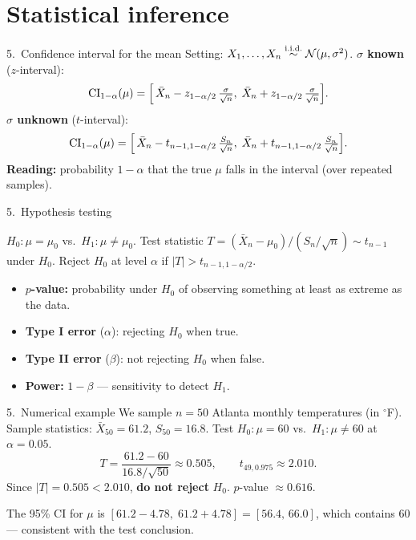 \documentclass[aspectratio=169]{beamer}
\begin{document}
\section{Statistical inference}

\begin{frame}{5.~Confidence interval for the mean}
  Setting: $X_1, \dots, X_n \overset{\text{i.i.d.}}{\sim} \mathcal{N}(\mu, \sigma^2)$.
  \medskip
  \textbf{$\sigma$ known} ($z$-interval):
  \[
    \mathrm{CI}_{1-\alpha}(\mu)
    = \Bigl[\,\bar{X}_n - z_{1-\alpha/2}\, \tfrac{\sigma}{\sqrt{n}},\;
            \bar{X}_n + z_{1-\alpha/2}\, \tfrac{\sigma}{\sqrt{n}}\Bigr].
  \]
  \textbf{$\sigma$ unknown} ($t$-interval):
  \[
    \mathrm{CI}_{1-\alpha}(\mu)
    = \Bigl[\,\bar{X}_n - t_{n-1,1-\alpha/2}\, \tfrac{S_n}{\sqrt{n}},\;
            \bar{X}_n + t_{n-1,1-\alpha/2}\, \tfrac{S_n}{\sqrt{n}}\Bigr].
  \]
  \medskip
  \textbf{Reading:} probability $1 - \alpha$ that the true $\mu$ falls
  in the interval (over repeated samples).
\end{frame}

\begin{frame}{5.~Hypothesis testing}
  \begin{defbox}
    $H_0: \mu = \mu_0$ vs.\ $H_1: \mu \neq \mu_0$. Test statistic
    $T = (\bar{X}_n - \mu_0) / (S_n / \sqrt{n}) \sim t_{n-1}$ under $H_0$.
    Reject $H_0$ at level $\alpha$ if $|T| > t_{n-1, 1-\alpha/2}$.
  \end{defbox}
  \medskip
  \begin{itemize}
    \item \textbf{$p$-value:} probability under $H_0$ of observing
          something at least as extreme as the data.
    \item \textbf{Type I error} ($\alpha$): rejecting $H_0$ when true.
    \item \textbf{Type II error} ($\beta$): not rejecting $H_0$ when false.
    \item \textbf{Power:} $1 - \beta$ — sensitivity to detect $H_1$.
  \end{itemize}
\end{frame}

\begin{frame}{5.~Numerical example}
  We sample $n = 50$ Atlanta monthly temperatures (in $^\circ$F).
  Sample statistics: $\bar{X}_{50} = 61.2$, $S_{50} = 16.8$.
  Test $H_0: \mu = 60$ vs.\ $H_1: \mu \neq 60$ at $\alpha = 0.05$.
  \medskip
  \[
    T = \frac{61.2 - 60}{16.8 / \sqrt{50}} \approx 0.505,
    \qquad
    t_{49, 0.975} \approx 2.010.
  \]
  Since $|T| = 0.505 < 2.010$, \textbf{do not reject} $H_0$.
  $p$-value $\approx 0.616$.
  \medskip
  \begin{infobox}
    The 95\% CI for $\mu$ is
    $[61.2 - 4.78,\; 61.2 + 4.78] = [56.4,\, 66.0]$,
    which contains $60$ — consistent with the test conclusion.
  \end{infobox}
\end{frame}
\end{document}
